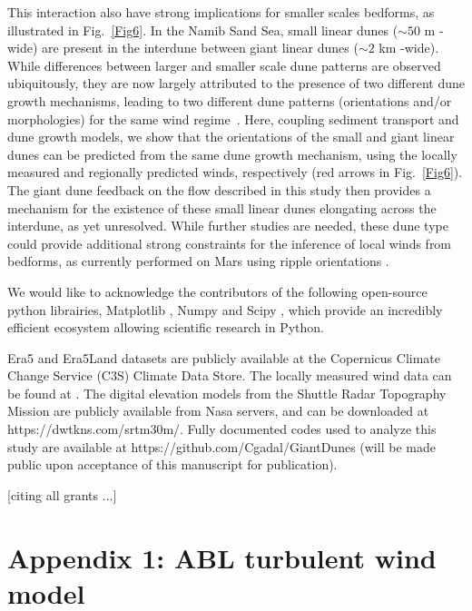  This interaction also have strong implications for smaller scales bedforms, as illustrated in Fig.~\ref{Fig6}. In the Namib Sand Sea, small linear dunes ($\sim 50$ m -wide) are present in the interdune between giant linear dunes ($\sim 2$ km -wide). While differences between larger and smaller scale dune patterns are observed ubiquitously, they are now largely attributed to the presence of two different dune growth mechanisms, leading to two different dune patterns (orientations and/or morphologies) for the same wind regime~\citep{Courrech2014, Runyon2017, lu2017, Song2019, Hu2021}. Here, coupling sediment transport and dune growth models, we show that the orientations of the small and giant linear dunes can be predicted from the same dune growth mechanism, using the locally measured and regionally predicted winds, respectively (red arrows in Fig.~\ref{Fig6}). The giant dune feedback on the flow described in this study then provides a mechanism for the existence of these small linear dunes elongating across the interdune, as yet unresolved. While further studies are needed, these dune type could provide additional strong constraints for the inference of local winds from bedforms, as currently performed on Mars using ripple orientations \citep{Liu2015, Hood2021}.


\begin{acknowledgements}
We would like to acknowledge the contributors of the following open-source python librairies, Matplotlib \citep{Hunter2007}, Numpy \citep{Harris2020} and Scipy \citep{Virtanen2020}, which provide an incredibly efficient ecosystem allowing scientific research in Python.

Era5 and Era5Land datasets are publicly available at the Copernicus Climate Change Service (C3S) Climate Data Store. The locally measured wind data can be found at . The digital elevation models from the Shuttle Radar Topography Mission are publicly available from Nasa servers, and can be downloaded at https://dwtkns.com/srtm30m/. Fully documented codes used to analyze this study are available at https://github.com/Cgadal/GiantDunes (will be made public upon acceptance of this manuscript for publication).

[citing all grants ...]\\
\end{acknowledgements}

\section*{Appendix 1: ABL turbulent wind model}
\label{turbulent_wind_model}


